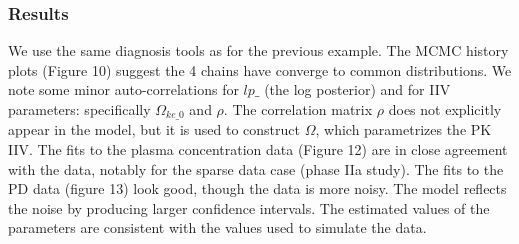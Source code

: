 \documentclass[11pt]{amsart}
\begin{document}
\subsubsection*{Results} We use the same diagnosis tools as for the previous example. The MCMC history plots (Figure 10) suggest the 4 chains have converge to common distributions. We note some minor auto-correlations for $lp\_$ (the log posterior) and for IIV parameters: specifically $\Omega_{ke\_0}$ and $\rho$. The correlation matrix $\rho$ does not explicitly appear in the model, but it is used to construct $\Omega$, which parametrizes the PK IIV. The fits to the plasma concentration data (Figure 12) are in close agreement with the data, notably for the sparse data case (phase IIa study). The fits to the PD data (figure 13) look good, though the data is more noisy. The model reflects the noise by producing larger confidence intervals. The estimated values of the parameters are consistent with the values used to simulate the data. 
\end{document}
